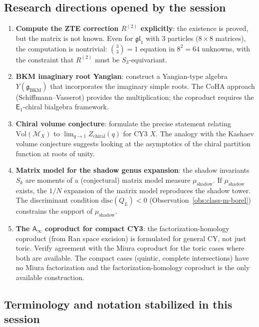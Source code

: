 \documentclass[11pt]{article}
\newcommand{\cM}{\mathcal{M}}
\newcommand{\fg}{\mathfrak{g}}
\newcommand{\fgl}{\mathfrak{gl}}
\newcommand{\Eone}{\mathsf{E}_1}
\newcommand{\Ainf}{\mathsf{A}_{\infty}}
\begin{document}
\subsection{Research directions opened by the session}
\label{subsec:research-opened}

\begin{enumerate}[label=\textup{(\arabic*)}]
 \item \textbf{Compute the ZTE correction $R^{(2)}$ explicitly}:
 the existence is proved, but the matrix is not known. Even for
 $\fgl_1$ with $3$ particles ($8 \times 8$ matrices), the computation
 is nontrivial: $\binom{3}{3} = 1$ equation in $8^2 = 64$ unknowns,
 with the constraint that $R^{(2)}$ must be $S_3$-equivariant.

 \item \textbf{BKM imaginary root Yangian}: construct a Yangian-type
 algebra $Y(\fg_{\mathrm{BKM}})$ that incorporates the imaginary
 simple roots. The CoHA approach (Schiffmann--Vasserot) provides
 the multiplication; the coproduct requires the $\Eone$-chiral
 bialgebra framework.

 \item \textbf{Chiral volume conjecture}: formulate the precise
 statement relating $\mathrm{Vol}(\cM_X)$ to
 $\lim_{q \to 1} Z_{\mathrm{chiral}}(q)$ for CY3 $X$. The
 analogy with the Kashaev volume conjecture suggests looking at
 the asymptotics of the chiral partition function at roots of unity.

 \item \textbf{Matrix model for the shadow genus expansion}:
 the shadow invariants $S_k$ are moments of a (conjectural) matrix
 model measure $\mu_{\mathrm{shadow}}$. If $\mu_{\mathrm{shadow}}$
 exists, the $1/N$ expansion of the matrix model reproduces the
 shadow tower. The discriminant condition
 $\mathrm{disc}(Q_L) < 0$ (Observation~\ref{obs:class-m-borel})
 constrains the support of $\mu_{\mathrm{shadow}}$.

 \item \textbf{The $\Ainf$ coproduct for compact CY3}: the
 factorization-homology coproduct (from Ran space excision) is
 formulated for general CY, not just toric. Verify agreement with
 the Miura coproduct for the toric cases where both are available.
 The compact cases (quintic, complete intersections) have no Miura
 factorization and the factorization-homology coproduct is the
 only available construction.
\end{enumerate}

\subsection{Terminology and notation stabilized in this session}
\label{subsec:terminology-stabilized}
\end{document}
